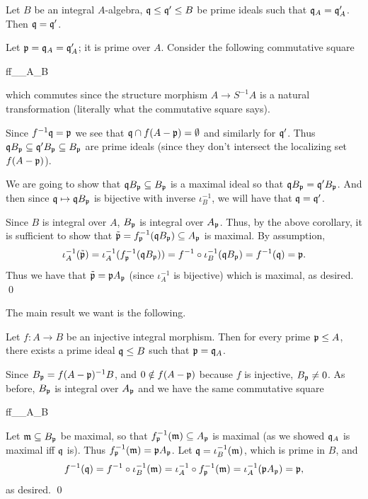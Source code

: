 \eproof

\bcoro

    Let $B$ be an integral $A$-algebra, ${{\frak q}}\leq{{\frak q}}'\leq B$ be prime ideals such that ${{\frak q}}_A={{\frak q}}'_A$.
    Then ${{\frak q}}={{\frak q}}'$.

\ecoro

\bproof

    Let ${{\frak p}}={{\frak q}}_A={{\frak q}}'_A$; it is prime over $A$.
    Consider the following commutative square

        {f}{f_\p}{\iota_A}{\iota_B}

    which commutes since the structure morphism $A\to S^{-1}A$ is a natural transformation (literally what the commutative square says).

    Since $f^{-1}{{\frak q}}={{\frak p}}$ we see that ${{\frak q}}\cap f(A-{{\frak p}})=\emptyset$ and similarly for ${{\frak q}}'$.
    Thus ${{\frak q}} B_{{\frak p}}\subseteq{{\frak q}}' B_{{\frak p}}\subseteq B_{{\frak p}}$ are prime ideals (since they don't intersect the localizing set $f(A-{{\frak p}})$).

    We are going to show that ${{\frak q}} B_{{\frak p}}\subseteq B_{{\frak p}}$ is a maximal ideal so that ${{\frak q}} B_{{\frak p}}={{\frak q}}' B_{{\frak p}}$.
    And then since ${{\frak q}}\mapsto{{\frak q}} B_{{\frak p}}$ is bijective with inverse $\iota_B^{-1}$, we will have that ${{\frak q}}={{\frak q}}'$.

    Since $B$ is integral over $A$, $B_{{\frak p}}$ is integral over $A_{{\frak p}}$.
    Thus, by the above corollary, it is sufficient to show that $\tilde{{{\frak p}}}=f_{{\frak p}}^{-1}({{\frak q}} B_{{\frak p}})\subseteq A_{{\frak p}}$ is maximal.
    By assumption,
    $$ \iota_A^{-1}(\tilde{{{\frak p}}}) = \iota_A^{-1}(f_{{\frak p}}^{-1}({{\frak q}} B_{{\frak p}})) = f^{-1}\circ\iota_B^{-1}({{\frak q}} B_{{\frak p}}) = f^{-1}({{\frak q}}) = {{\frak p}} . $$
    Thus we have that $\tilde{{{\frak p}}}={{\frak p}} A_{{\frak p}}$ (since $\iota_A^{-1}$ is bijective) which is maximal, as desired.
    \qed

\eproof

The main result we want is the following.

\bthrm

    Let $f\colon A\to B$ be an injective integral morphism.
    Then for every prime ${{\frak p}}\leq A$, there exists a prime ideal ${{\frak q}}\leq B$ such that ${{\frak p}}={{\frak q}}_A$.

\ethrm

\bproof

    Since $B_{{\frak p}}=f(A-{{\frak p}})^{-1}B$, and $0\notin f(A-{{\frak p}})$ because $f$ is injective, $B_{{\frak p}}\neq0$.
    As before, $B_{{\frak p}}$ is integral over $A_{{\frak p}}$ and we have the same commutative square

        {f}{f_\p}{\iota_A}{\iota_B}

    Let ${{\frak m}}\subseteq B_{{\frak p}}$ be maximal, so that $f_{{\frak p}}^{-1}({{\frak m}})\subseteq A_{{\frak p}}$ is maximal (as we showed ${{\frak q}}_A$ is maximal iff ${{\frak q}}$ is).
    Thus $f_{{\frak p}}^{-1}({{\frak m}})={{\frak p}} A_{{\frak p}}$.
    Let ${{\frak q}}=\iota_B^{-1}({{\frak m}})$, which is prime in $B$, and
    $$ f^{-1}({{\frak q}}) = f^{-1}\circ\iota_B^{-1}({{\frak m}}) = \iota_A^{-1}\circ f_{{\frak p}}^{-1}({{\frak m}}) = \iota_A^{-1}({{\frak p}} A_{{\frak p}}) = {{\frak p}} , $$
    as desired.
    \qed

